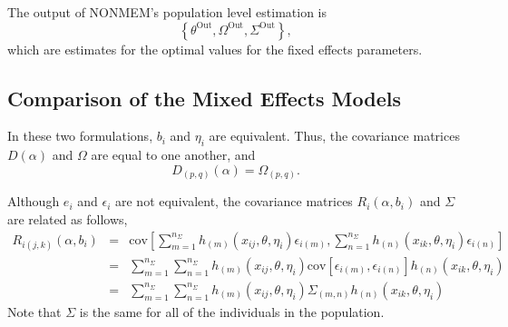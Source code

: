 \documentclass{article}
\begin{document}
The output of NONMEM's population level estimation is
  \begin{equation}
    \left\{ \theta^{\mbox{Out}}, \Omega^{\mbox{Out}},
      \Sigma^{\mbox{Out}} \right\} ,
  \end{equation}
which are estimates for the optimal values for the fixed 
effects parameters.


\subsection{Comparison of the Mixed Effects Models}

In these two formulations, $b_i$ and $\eta_i$ are
equivalent.
Thus, the covariance matrices $D(\alpha)$ and 
$\Omega$ are equal to one another, and
  \begin{equation}
    D_{(p,q)}(\alpha) = \Omega_{(p,q)} .
  \end{equation}

Although $e_i$ and $\epsilon_i$ are not equivalent, 
the covariance matrices $R_i(\alpha, b_i)$ and 
$\Sigma$ are related as follows,
  \begin{eqnarray*}
    R_{i(j,k)}(\alpha, b_i) & = &  \mbox{cov} \left[
      \sum_{m=1}^{n_{\Sigma}} h_{(m)}(x_{ij}, \theta, \eta_i) \epsilon_{i(m)},
      \sum_{n=1}^{n_{\Sigma}} h_{(n)}(x_{ik}, \theta, \eta_i) \epsilon_{i(n)} \right] \\
    & = & \sum_{m=1}^{n_{\Sigma}} \sum_{n=1}^{n_{\Sigma}} 
      h_{(m)}(x_{ij}, \theta, \eta_i) 
      \mbox{cov} [ \epsilon_{i(m)} , \epsilon_{i(n)} ]
      h_{(n)}(x_{ik}, \theta, \eta_i)  \\
    & = & \sum_{m=1}^{n_{\Sigma}} \sum_{n=1}^{n_{\Sigma}} 
      h_{(m)}(x_{ij}, \theta, \eta_i) 
      \Sigma_{(m,n)}
      h_{(n)}(x_{ik}, \theta, \eta_i)
  \end{eqnarray*}
Note that $\Sigma$ is the same for all of the individuals in
the population.


%
%
\end{document}
